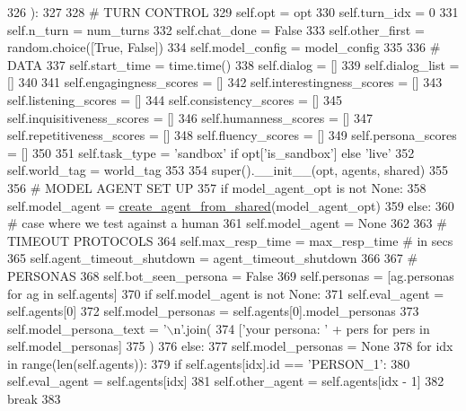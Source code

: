 \begin{DoxyCode}
326     ):
327 
328         \textcolor{comment}{# TURN CONTROL}
329         self.opt = opt
330         self.turn\_idx = 0
331         self.n\_turn = num\_turns
332         self.chat\_done = \textcolor{keyword}{False}
333         self.other\_first = random.choice([\textcolor{keyword}{True}, \textcolor{keyword}{False}])
334         self.model\_config = model\_config
335 
336         \textcolor{comment}{# DATA}
337         self.start\_time = time.time()
338         self.dialog = []
339         self.dialog\_list = []
340 
341         self.engagingness\_scores = []
342         self.interestingness\_scores = []
343         self.listening\_scores = []
344         self.consistency\_scores = []
345         self.inquisitiveness\_scores = []
346         self.humanness\_scores = []
347         self.repetitiveness\_scores = []
348         self.fluency\_scores = []
349         self.persona\_scores = []
350 
351         self.task\_type = \textcolor{stringliteral}{'sandbox'} \textcolor{keywordflow}{if} opt[\textcolor{stringliteral}{'is\_sandbox'}] \textcolor{keywordflow}{else} \textcolor{stringliteral}{'live'}
352         self.world\_tag = world\_tag
353 
354         super().\_\_init\_\_(opt, agents, shared)
355 
356         \textcolor{comment}{# MODEL AGENT SET UP}
357         \textcolor{keywordflow}{if} model\_agent\_opt \textcolor{keywordflow}{is} \textcolor{keywordflow}{not} \textcolor{keywordtype}{None}:
358             self.model\_agent = \hyperlink{namespaceparlai_1_1core_1_1agents_aa5af5dd1d2f9da491b60348d479b849f}{create\_agent\_from\_shared}(model\_agent\_opt)
359         \textcolor{keywordflow}{else}:
360             \textcolor{comment}{# case where we test against a human}
361             self.model\_agent = \textcolor{keywordtype}{None}
362 
363         \textcolor{comment}{# TIMEOUT PROTOCOLS}
364         self.max\_resp\_time = max\_resp\_time  \textcolor{comment}{# in secs}
365         self.agent\_timeout\_shutdown = agent\_timeout\_shutdown
366 
367         \textcolor{comment}{# PERSONAS}
368         self.bot\_seen\_persona = \textcolor{keyword}{False}
369         self.personas = [ag.personas \textcolor{keywordflow}{for} ag \textcolor{keywordflow}{in} self.agents]
370         \textcolor{keywordflow}{if} self.model\_agent \textcolor{keywordflow}{is} \textcolor{keywordflow}{not} \textcolor{keywordtype}{None}:
371             self.eval\_agent = self.agents[0]
372             self.model\_personas = self.agents[0].model\_personas
373             self.model\_persona\_text = \textcolor{stringliteral}{'\(\backslash\)n'}.join(
374                 [\textcolor{stringliteral}{'your persona: '} + pers \textcolor{keywordflow}{for} pers \textcolor{keywordflow}{in} self.model\_personas]
375             )
376         \textcolor{keywordflow}{else}:
377             self.model\_personas = \textcolor{keywordtype}{None}
378             \textcolor{keywordflow}{for} idx \textcolor{keywordflow}{in} range(len(self.agents)):
379                 \textcolor{keywordflow}{if} self.agents[idx].id == \textcolor{stringliteral}{'PERSON\_1'}:
380                     self.eval\_agent = self.agents[idx]
381                     self.other\_agent = self.agents[idx - 1]
382                     \textcolor{keywordflow}{break}
383 
\end{DoxyCode}
